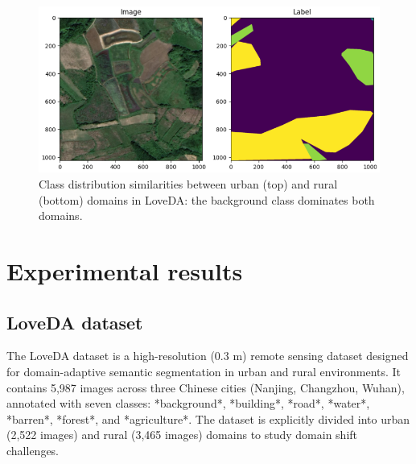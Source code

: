 \documentclass{article}
\begin{document}
\begin{multicols}{2}
\begin{figure}[H]
\begin{minipage}{1\linewidth}
			\end{minipage}
			\begin{minipage}{1\linewidth}
				\centering
				\includegraphics[width=1\linewidth]{image/rural+mask4.png}
				
			\end{minipage}
			\caption{Class distribution similarities between urban (top) and rural (bottom) domains in LoveDA: the background class dominates both domains.}  
			\label{fig:class_eug}  

		\end{figure}



		\section{Experimental results}

		\subsection{LoveDA dataset}  
		The LoveDA dataset \cite{loveda2021} is a high-resolution (0.3 m) remote sensing dataset designed for domain-adaptive semantic segmentation in urban and rural environments. It contains 5,987 images across three Chinese cities (Nanjing, Changzhou, Wuhan), annotated with seven classes: *background*, *building*, *road*, *water*, *barren*, *forest*, and *agriculture*. The dataset is explicitly divided into urban (2,522 images) and rural (3,465 images) domains to study domain shift challenges.  
		

\end{multicols}
\end{document}

